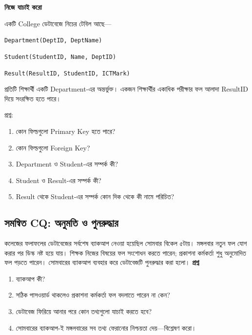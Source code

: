 \begin{practicebox}

\textbf{নিজে যাচাই করো}

একটি College ডেটাবেজে নিচের টেবিল আছে---

\noindent\texttt{Department(DeptID, DeptName)}\par

\noindent\texttt{Student(StudentID, Name, DeptID)}\par

\noindent\texttt{Result(ResultID, StudentID, ICTMark)}\par

প্রতিটি শিক্ষার্থী একটি Department-এর অন্তর্ভুক্ত। একজন শিক্ষার্থীর
একাধিক পরীক্ষার ফল আলাদা ResultID দিয়ে সংরক্ষিত হতে পারে।

প্রশ্ন:

\begin{enumerate}
    \item কোন ফিল্ডগুলো Primary Key হতে পারে?
    \item কোন ফিল্ডগুলো Foreign Key?
    \item Department ও Student-এর সম্পর্ক কী?
    \item Student ও Result-এর সম্পর্ক কী?
    \item Result থেকে Student-এর সম্পর্ক কোন দিক থেকে কী নামে পরিচিত?
\end{enumerate}

\end{practicebox}





\par\nointerlineskip\vspace{4pt}\noindent\begin{minipage}{\linewidth}
\subsection{সমন্বিত CQ: অনুমতি ও পুনরুদ্ধার}
কলেজের ফলাফলের ডেটাবেজের সর্বশেষ ব্যাকআপ নেওয়া হয়েছিল সোমবার বিকেল ৫টায়। মঙ্গলবার নতুন ফল যোগ করার পর ডিস্ক নষ্ট হয়ে যায়। শিক্ষক নিজের বিষয়ের ফল সংশোধন করতে পারেন; প্রকাশনা কর্মকর্তা শুধু অনুমোদিত ফল পড়তে পারেন। সোমবারের ব্যাকআপ ব্যবহার করে ডেটাবেজটি পুনরুদ্ধার করা হলো।
\textbf{প্রশ্ন}
\begin{enumerate}[label=(\alph*)]
\item ব্যাকআপ কী?
\item সঠিক পাসওয়ার্ড থাকলেও প্রকাশনা কর্মকর্তা ফল বদলাতে পারেন না কেন?
\item ডেটাবেজ ফিরিয়ে আনার পরে কোন তথ্যগুলো যাচাই করতে হবে?
\item সোমবারের ব্যাকআপ-ই মঙ্গলবারের সব তথ্য ফেরানোর নিশ্চয়তা দেয়—বিশ্লেষণ করো।
\end{enumerate}
\end{minipage}\par


